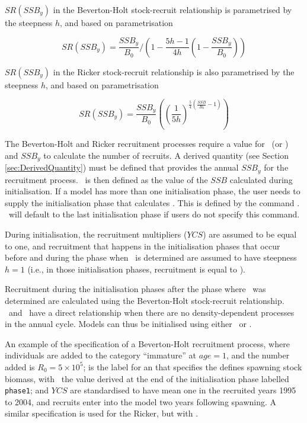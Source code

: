 $SR(SSB_y)$ in the Beverton-Holt stock-recruit relationship is parametrised by the steepness $h$, and based on \cite{mace_doonan_88} parametrisation

\begin{equation}\label{eq:BH_SR}
SR(SSB_y) = \frac{SSB_y}{B_0} / \left( 1-\frac{5h-1}{4h} \left( 1-\frac{SSB_y}{B_0} \right) \right)
\end{equation}

$SR(SSB_y)$ in the Ricker stock-recruit relationship is also parametrised by the steepness $h$, and based on \cite{mace_doonan_88} parametrisation

\begin{equation}\label{eq:RICKER_SR}
	SR(SSB_y) = \frac{SSB_y}{B_0} \left(\left(\frac{1}{5h}\right) ^ {\frac{5}{4} \left(\frac{SSB}{B_0}-1\right)} \right)
\end{equation}

The Beverton-Holt and Ricker recruitment processes require a value for \Bzero\ (or \Rzero) and $SSB_y$ to calculate the number of recruits. A derived quantity (see Section \ref{sec:DerivedQuantity}) must be defined that provides the annual $SSB_y$ for the recruitment process. \Bzero\ is then defined as the value of the $SSB$ calculated during initialisation. If a model has more than one initialisation phase, the user needs to supply the initialisation phase that calculates \Bzero. This is defined by the command . \CNAME\ will default to the last initialisation phase if users do not specify this command.

During initialisation, the recruitment multipliers ($YCS$) are assumed to be equal to one, and recruitment that happens in the initialisation phases that occur before and during the phase when \Bzero\ is determined are assumed to have steepness $h=1$ (i.e., in those initialisation phases, recruitment is equal to \Rzero).

Recruitment during the initialisation phases after the phase where \Bzero\ was determined are calculated using the Beverton-Holt stock-recruit relationship. \Rzero\ and \Bzero\ have a direct relationship when there are no density-dependent processes in the annual cycle. Models can thus be initialised using either \Bzero\ or \Rzero.

An example of the specification of a Beverton-Holt recruitment process, where individuals are added to the category \enquote{immature} at $age=1$, and the number added is $R_0=5 \times 10^5$;  is the label for an  that specifies the defines spawning stock biomass, with \Bzero\ the value derived at the end of the initialisation phase labelled \texttt{phase1}; and $YCS$ are standardised to have mean one in the recruited years 1995 to 2004, and recruits enter into the model two years following spawning. A similar specification is used for the Ricker, but with .

